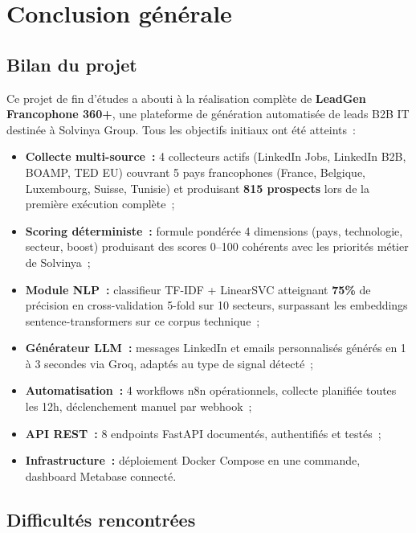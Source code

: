 \chapter*{Conclusion générale}

\section*{Bilan du projet}

Ce projet de fin d'études a abouti à la réalisation complète de
\textbf{LeadGen Francophone 360+}, une plateforme de génération automatisée de
leads B2B IT destinée à Solvinya Group. Tous les objectifs initiaux ont été
atteints~:

\begin{itemize}
  \item \textbf{Collecte multi-source~:} 4 collecteurs actifs (LinkedIn Jobs,
        LinkedIn B2B, BOAMP, TED EU) couvrant 5 pays francophones (France,
        Belgique, Luxembourg, Suisse, Tunisie) et produisant \textbf{815 prospects}
        lors de la première exécution complète~;
  \item \textbf{Scoring déterministe~:} formule pondérée 4 dimensions (pays,
        technologie, secteur, boost) produisant des scores 0--100 cohérents
        avec les priorités métier de Solvinya~;
  \item \textbf{Module NLP~:} classifieur TF-IDF + LinearSVC atteignant
        \textbf{75\%} de précision en cross-validation 5-fold sur 10 secteurs,
        surpassant les embeddings sentence-transformers sur ce corpus technique~;
  \item \textbf{Générateur LLM~:} messages LinkedIn et emails personnalisés
        générés en 1 à 3 secondes via Groq, adaptés au type de signal détecté~;
  \item \textbf{Automatisation~:} 4 workflows n8n opérationnels, collecte
        planifiée toutes les 12h, déclenchement manuel par webhook~;
  \item \textbf{API REST~:} 8 endpoints FastAPI documentés, authentifiés et
        testés~;
  \item \textbf{Infrastructure~:} déploiement Docker Compose en une commande,
        dashboard Metabase connecté.
\end{itemize}

\section*{Difficultés rencontrées}

